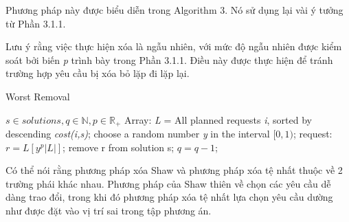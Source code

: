 Phương pháp này được biểu diễn trong Algorithm 3. Nó sử dụng lại vài ý tưởng từ Phần 3.1.1.

Lưu ý rằng việc thực hiện xóa là ngẫu nhiên, với mức độ ngẫu nhiên được kiểm soát bởi biến \textit{p} trình bày trong Phần 3.1.1. Điều này được thực hiện để tránh trường hợp yêu cầu bị xóa bỏ lặp đi lặp lại.

\begin{algorithm}
    \caption{Worst Removal} 
	\begin{algorithmic}[1]
        \Require $s \in {solutions}, q \in \mathbb{N}, p \in \mathbb{R}_{+}$
		  \State Array: \textit{L} = All planned requests \textit{i}, sorted by descending \textit{cost(i,s)};
            \State choose a random number \textit{y} in the interval $[0, 1)$;
            \State request: $r = L\left[ y^p |L| \right]$;
            \State remove r from solution s;
            \State $q = q-1$;
        \EndWhile
	\end{algorithmic} 
\end{algorithm}

Có thể nói rằng phương pháp xóa Shaw và phương pháp xóa tệ nhất thuộc về 2 trường phái khác nhau. Phương pháp của Shaw thiên về chọn các yêu cầu dễ dàng trao đổi, trong khi đó phương pháp xóa tệ nhất lựa chọn yêu cầu dường như được đặt vào vị trí sai trong tập phương án.